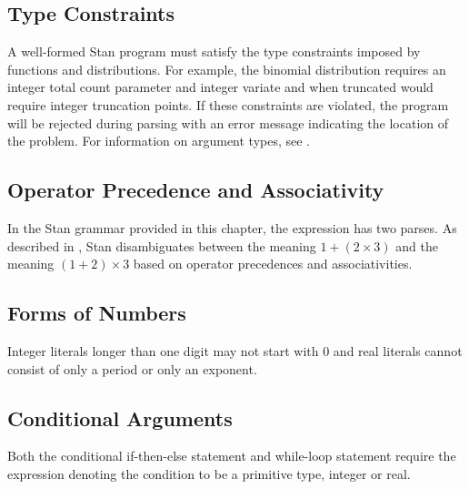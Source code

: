 \subsection{Type Constraints}

A well-formed Stan program
must satisfy the type constraints imposed by functions and
distributions.  For example, the binomial distribution requires an
integer total count parameter and integer variate and when truncated
would require integer truncation points.  If these constraints are
violated, the program will be rejected during parsing with an error
message indicating the location of the problem.  For information on
argument types, see .

\subsection{Operator Precedence and Associativity}

In the Stan grammar provided in this chapter, the expression  has two parses.  As described in
, Stan disambiguates between the
meaning $1 + (2 \times 3)$ and the meaning $(1 + 2) \times 3$ based on
operator precedences and associativities. 

\subsection{Forms of Numbers}

Integer literals longer than one digit may not start with 0 and real
literals cannot consist of only a period or only an exponent.

\subsection{Conditional Arguments}

Both the conditional if-then-else statement and while-loop statement
require the expression denoting the condition to be a primitive type,
integer or real.
